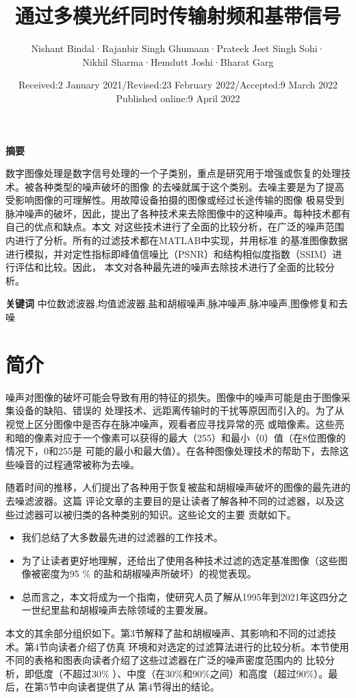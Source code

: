 \documentclass{article} %
\title{通过多模光纤同时传输射频和基带信号}  %
\author{Nishant Bindal·Rajanbir Singh Ghumaan·Prateek Jeet Singh Sohi·
 \\Nikhil Sharma·Hemdutt Joshi·Bharat Garg}%
\date{Received:2 January 2021/Revised:23 February 2022/Accepted:9 March 2022
\\Published online:9 April 2022}       %
\begin{document}
\maketitle          %

\textbf{摘要}

数字图像处理是数字信号处理的一个子类别，重点是研究用于增强或恢复的处理技术。被各种类型的噪声破坏的图像
的去噪就属于这个类别。去噪主要是为了提高受影响图像的可理解性。用故障设备拍摄的图像或经过长途传输的图像
极易受到脉冲噪声的破坏，因此，提出了各种技术来去除图像中的这种噪声。每种技术都有自己的优点和缺点。本文
对这些技术进行了全面的比较分析，在广泛的噪声范围内进行了分析。所有的过滤技术都在MATLAB中实现，并用标准
的基准图像数据进行模拟，并对定性指标即峰值信噪比（PSNR）和结构相似度指数（SSIM）进行评估和比较。因此，
本文对各种最先进的噪声去除技术进行了全面的比较分析。
\bigskip

\textbf{关键词}
\quad 中位数滤波器,均值滤波器,盐和胡椒噪声,脉冲噪声,脉冲噪声,图像修复和去噪

\section{简介}
噪声对图像的破坏可能会导致有用的特征的损失。图像中的噪声可能是由于图像采集设备的缺陷、错误的
处理技术、远距离传输时的干扰等原因而引入的。为了从视觉上区分图像中是否存在脉冲噪声，观看者应寻找异常的亮
或暗像素。这些亮和暗的像素对应于一个像素可以获得的最大（255）和最小（0）值（在8位图像的情况下，0和255是
可能的最小和最大值）。在各种图像处理技术的帮助下，去除这些噪音的过程通常被称为去噪。\par

\hspace{2em}随着时间的推移，人们提出了各种用于恢复被盐和胡椒噪声破坏的图像的最先进的去噪滤波器。这篇
评论文章的主要目的是让读者了解各种不同的过滤器，以及这些过滤器可以被归类的各种类别的知识。这些论文的主要
贡献如下。

\begin{itemize}
\item 我们总结了大多数最先进的过滤器的工作技术。
\item 为了让读者更好地理解，还给出了使用各种技术过滤的选定基准图像（这些图像被密度为95 \% 的盐和胡椒噪声所破坏）的视觉表现。
\item 总而言之，本文将成为一个指南，使研究人员了解从1995年到2021年这四分之一世纪里盐和胡椒噪声去除领域的主要发展。
\end{itemize}

\hspace{2em}本文的其余部分组织如下。第3节解释了盐和胡椒噪声、其影响和不同的过滤技术。第4节向读者介绍了仿真
环境和对选定的过滤算法进行的比较分析。本节使用不同的表格和图表向读者介绍了这些过滤器在广泛的噪声密度范围内的
比较分析，即低度（不超过30\% ）、中度（在30\%和90\%之间）和高度（超过90\%）。最后，在第5节中向读者提供了从
第4节得出的结论。
\end{document}

